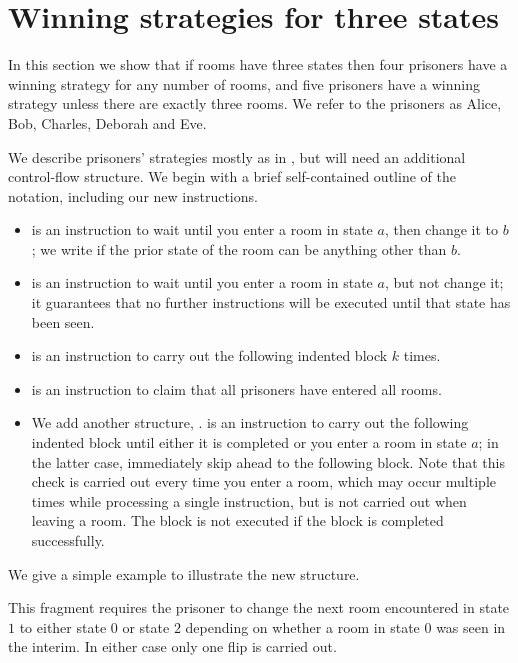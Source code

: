 \documentclass[a4paper,11pt]{extarticle}
\theoremstyle{definition}
\theoremstyle{remark}
\begin{document}
	\section{Winning strategies for three states}\label{sec:three}
	In this section we show that if rooms have three states then four prisoners have a winning strategy for any number of rooms, and five prisoners have a winning strategy unless there are exactly three rooms. We refer to the prisoners as Alice, Bob, Charles, Deborah and Eve.
	
	We describe prisoners' strategies mostly as in \cite{KK21}, but will need an additional control-flow structure. We begin with a brief self-contained outline of the notation, including our new instructions.
	\begin{itemize}
		\item {} is an instruction to wait until you enter a room in state $a$, then change it to $b$; we write  if the prior state of the room can be anything other than $b$.
		\item {} is an instruction to wait until you enter a room in state $a$, but not change it; it guarantees that no further instructions will be executed until that state has been seen. 
		\item {} is an instruction to carry out the following indented block $k$ times. 
		\item \dec is an instruction to claim that all prisoners have entered all rooms. 
		\item We add another structure, \wotext{$\cdots$}\eltext.  is an instruction to carry out the following indented block until either it is completed or you enter a room in state $a$; in the latter case, immediately skip ahead to the following \eltext block. Note that this check is carried out every time you enter a room, which may occur multiple times while processing a single instruction, but is not carried out when leaving a room. The \eltext block is not executed if the \wotext block is completed successfully. 
	\end{itemize}
	We give a simple example to illustrate the new structure.
	
	\NoCaptionOfAlgo
	\DontPrintSemicolon
	\begin{algorithm}[H]
		\caption{Example}
	\end{algorithm}
	This fragment requires the prisoner to change the next room encountered in state $1$ to either state $0$ or state $2$ depending on whether a room in state $0$ was seen in the interim. In either case only one flip is carried out.
	
\end{document}
